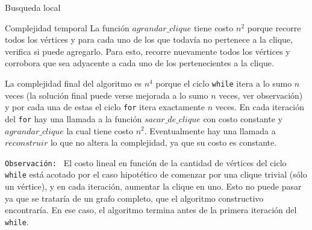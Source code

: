 \begin{section}{Busqueda local}
\begin{subsection}{Complejidad temporal}
			La función $agrandar\_clique$ tiene costo $n^2$ porque recorre todos los vértices y para cada uno de los que todavía no pertenece a la clique, verifica si puede agregarlo. Para esto, recorre nuevamente todos los vértices y corrobora que sea adyacente a cada uno de los pertenecientes a la clique.

			La complejidad final del algoritmo es $n^4$ porque el ciclo \texttt{while} itera a lo sumo $n$ veces (la solución final puede verse mejorada a lo sumo $n$ veces, ver observación) y por cada una de estas el ciclo \texttt{for} itera exactamente $n$ veces. En cada iteración del \texttt{for} hay una llamada a la función $sacar\_de\_clique$ con costo constante y $agrandar\_clique$ la cual tiene costo $n^2$. Eventualmente hay una llamada a $reconstruir$ lo que no altera la complejidad, ya que su costo es constante.
			
			\texttt{Observación: } El costo lineal en función de la cantidad de vértices del ciclo \texttt{while} está acotado por el caso hipotético de comenzar por una clique trivial (sólo un vértice), y en cada iteración, aumentar la clique en uno. Esto no puede pasar ya que se trataría de un grafo completo, que el algoritmo constructivo encontraría. En ese caso, el algoritmo termina antes de la primera iteración del \texttt{while}.
		\end{subsection}
\end{section}



